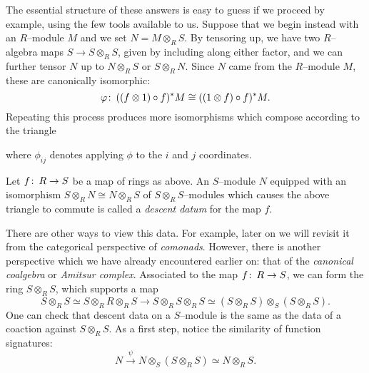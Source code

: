 The essential structure of these answers is easy to guess if we proceed by example, using the few tools available to us.  Suppose that we begin instead with an $R$--module $M$ and we set $N = M \otimes_R S$.  By tensoring up, we have two $R$--algebra maps $S \to S \otimes_R S$, given by including along either factor, and we can further tensor $N$ up to $N \otimes_R S$ or $S \otimes_R N$.  Since $N$ came from the $R$--module $M$, these are canonically isomorphic: \[\varphi\colon\thinspace ((f \otimes 1) \circ f)^* M \cong ((1 \otimes f) \circ f)^* M.\]   Repeating this process produces more isomorphisms which compose according to the triangle
\begin{center}
\end{center}
where $\phi_{ij}$ denotes applying $\phi$ to the $i${\th} and $j${\th} coordinates.

\begin{definition}
Let $f\colon\thinspace R \to S$ be a map of rings as above.  An $S$--module $N$ equipped with an isomorphism $S \otimes_R N \cong N \otimes_R S$ of $S \otimes_R S$--modules which causes the above triangle to commute is called a \textit{descent datum} for the map $f$.
\end{definition}

\begin{remark}\label{CanonicalCoring}
There are other ways to view this data.  For example, later on we will revisit it from the categorical perspective of \textit{comonads}.  However, there is another perspective which we have already encountered earlier on: that of the \textit{canonical coalgebra} or \textit{Amitsur complex}.  Associated to the map $f\colon\thinspace R \to S$, we can form the ring $S \otimes_R S$, which supports a map \[S \otimes_R S \simeq S \otimes_R R \otimes_R S \to S \otimes_R S \otimes_R S \simeq (S \otimes_R S) \otimes_S (S \otimes_R S).\]  One can check that descent data on a $S$--module is the same as the data of a coaction against $S \otimes_R S$.  As a first step, notice the similarity of function signatures: \[N \xrightarrow{\psi} N \otimes_S (S \otimes_R S) \simeq N \otimes_R S.\]
\end{remark}

